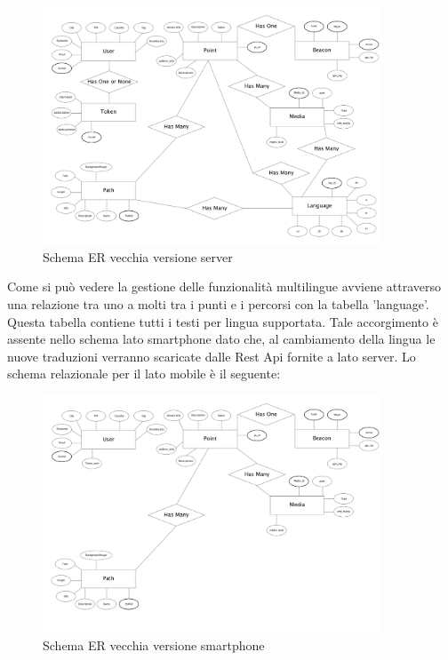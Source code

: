 \begin{figure}[h]
\centering
\includegraphics[width=0.9\textwidth]{images/erOld.png}
\caption{Schema ER vecchia versione server}
\end{figure}
\vspace{5mm}

Come si può vedere la gestione delle funzionalità multilingue avviene attraverso una relazione tra uno a molti tra i punti e i percorsi con la tabella 'language'. Questa tabella contiene tutti i testi per lingua supportata. Tale accorgimento è assente nello schema lato smartphone dato che, al cambiamento della lingua le nuove traduzioni verranno scaricate dalle Rest Api fornite a lato server. Lo schema relazionale per il lato mobile è il seguente:\vspace{30mm}

\begin{figure}[h]
\centering
\includegraphics[width=0.9\textwidth]{images/erOldSpartphone.png}
\caption{Schema ER vecchia versione smartphone}
\end{figure}
\vspace{5mm}
	
